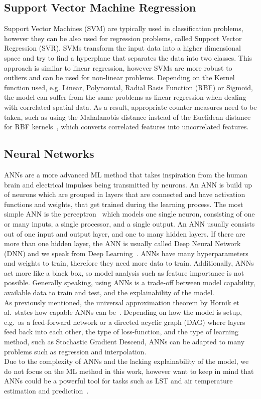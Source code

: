 \subsection{Support Vector Machine Regression}

Support Vector Machines (SVM) are typically used in classification problems, however they can be also used for regression problems, called Support Vector Regression (SVR). SVMs transform the input data into a higher dimensional space and try to find a hyperplane that separates the data into two classes. This approach is similar to linear regression, however SVMs are more robust to outliers and can be used for non-linear problems. Depending on the Kernel function used, e.g. Linear, Polynomial, Radial Basis Function (RBF) or Sigmoid, the model can suffer from the same problems as linear regression when dealing with correlated spatial data.
As a result, appropriate counter measures need to be taken, such as using the Mahalanobis distance instead of the Euclidean distance for RBF kernels~\cite{kamada2006support}, which converts correlated features into uncorrelated features.

\subsection{Neural Networks}

ANNs are a more advanced ML method that takes inspiration from the human brain and electrical impulses being transmitted by neurons. An ANN is build up of neurons which are grouped in layers that are connected and have activation functions and weights, that get trained during the learning process. The most simple ANN is the perceptron~\cite{rosenblatt1957perceptron} which models one single neuron, consisting of one or many inputs, a single processor, and a single output. An ANN usually consists out of one input and output layer, and one to many hidden layers. If there are more than one hidden layer, the ANN is usually called Deep Neural Network (DNN) and we speak from Deep Learning~\cite{lecun2015deep}. ANNs have many hyperparameters and weights to train, therefore they need more data to train. Additionally, ANNs act more like a black box, so model analysis such as feature importance is not possible. Generally speaking, using ANNs is a trade-off between model capability, available data to train and test, and the explainability of the model.\\
As previously mentioned, the universal approximation theorem by Hornik et al.\ states how capable ANNs can be~\cite{hornik1989multilayer}. Depending on how the model is setup, e.g.\ as a feed-forward network or a directed acyclic graph (DAG) where layers feed back into each other, the type of loss-function, and the type of learning method, such as Stochastic Gradient Descend, ANNs can be adapted to many problems such as regression and interpolation.\\
Due to the complexity of ANNs and the lacking explainability of the model, we do not focus on the ML method in this work, however want to keep in mind that ANNs could be a powerful tool for tasks such as LST and air temperature estimation and prediction~\cite{yuan2020deep}.
